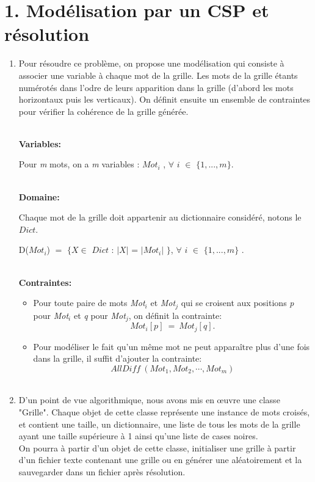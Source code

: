 \documentclass[a4paper,12pt]{report}
\begin{document}
\section*{1. Modélisation par un CSP et résolution}
\begin{enumerate}
\item Pour résoudre ce problème, on propose une modélisation qui consiste à associer une variable à chaque mot de la grille. Les mots de la grille étants numérotés dans l'odre de leurs apparition dans la grille (d'abord les mots horizontaux puis les verticaux). On définit ensuite un ensemble de contraintes pour vérifier la cohérence de la grille générée.

~~\\
\textbf{Variables:}


Pour \textit{m} mots, on a \textit{m} variables : \textit{$Mot_i$} , $\forall$ $i$  $\in$ $\{1, ... , m \}$.

~~\\
\textbf{Domaine:}


Chaque mot de la grille doit appartenir au dictionnaire considéré, notons le $Dict$.
\begin{center}
D(\textit{$Mot_i$}) $=$ $\{ X \in$ $Dict$  : $|X|$ = $|Mot_i|$ $\}$, $\forall$  $i$ $\in$ $\{1, ... , m \}$ .
\end{center}

~~\\
\textbf{Contraintes:}\\
\begin{itemize}
\item Pour toute paire de mots \textit{Mot$_i$} et \textit{Mot$_j$} qui se croisent aux positions \textit{p} pour \textit{Mot$_i$} et \textit{q} pour \textit{Mot$_j$}, on définit la contrainte:
$$\textit{Mot}_i [p]\ =\  \textit{Mot}_j [q] .$$ 

\item Pour modéliser le fait qu'un même mot ne peut apparaître plus d'une fois dans la grille, il suffit d'ajouter la contrainte:
$$ \textit{AllDiff}\ (\textit{Mot}_1, \textit{Mot}_2, \cdots , \textit{Mot}_m)  $$\\
\end{itemize}

\item D'un point de vue algorithmique, nous avons mis en œuvre une classe "Grille". Chaque objet de cette classe représente une instance de mots croisés, et contient une taille, un dictionnaire, une liste de tous les mots de la grille ayant une taille supérieure à 1 ainsi qu'une liste de cases noires.\\
On pourra à partir d'un objet de cette classe, initialiser une grille à partir d'un fichier texte contenant une grille ou en générer une aléatoirement et la sauvegarder dans un fichier après résolution.\\


\end{enumerate}
\end{document}
